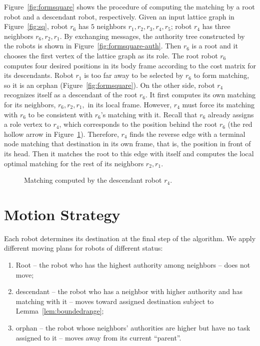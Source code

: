 Figure~\ref{fig:formsquare} shows the procedure of computing the matching by a root robot and a descendant robot, respectively. 
%
Given an input lattice graph in Figure~\ref{fig:sq}, robot $r_6$ has $5$ neighbors $r_1, r_2, r_3, r_4, r_5$; robot $r_4$ has three neighbors $r_6, r_2, r_1$. 
%
By exchanging messages, the authority tree constructed by the robots is shown in Figure~\ref{fig:formsquare-auth}.
%
Then $r_6$ is a root and it chooses the first vertex of the lattice graph as its role.
%
The root robot $r_6$ computes four desired positions in its body frame according to the cost matrix for its descendants.
%
Robot $r_1$ is too far away to be selected by $r_6$ to form matching, so it is an orphan (Figure~\ref{fig:formsquare}).
%
On the other side, robot $r_4$ recognizes itself as a descendant of the root $r_6$.
%
It first computes its own matching for its neighbors, $r_6, r_2, r_1,$ in its local frame. 
%
However, $r_4$ must force its matching with $r_6$ to be consistent with $r_6$'s matching with it.
%
Recall that $r_6$ already assigns a role vertex to $r_4$, which corresponds to the position behind the root $r_6$ (the red hollow arrow in Figure~\ref{fig:formsquare-des}).
%
Therefore, $r_4$ finds the reverse edge with a terminal node matching that destination in its own frame, that is, the position in front of its head. 
%
Then it matches the root to this edge with itself and computes the local optimal matching for the rest of its neighbors $r_2, r_1$.

\begin{figure}
    \centering
    \begin{minipage}{0.9\textwidth}
    \centering
    
    \end{minipage}
    \caption{Matching computed by the descendant robot $r_4$.}
    \label{fig:formsquare-des}
\end{figure}

\section{Motion Strategy}
\label{sec:motion}

Each robot determines its destination at the final step of the algorithm.  
%
We apply different moving plans for robots of different status:
\begin{enumerate}
\item Root -- the robot who has the highest authority among neighbors -- does not move;
\item descendant -- the robot who has a neighbor with higher authority and has matching with it -- moves toward assigned destination subject to Lemma~\ref{lem:boundedrange};
\item orphan -- the robot whose neighbors' authorities are higher but have no task assigned to it -- moves away from its current ``parent''.
\end{enumerate} 


